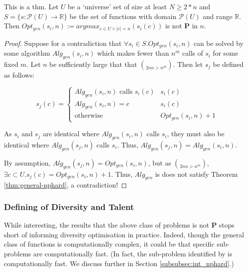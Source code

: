 \begin{theorem}\label{thm:general-nphard}
    This is a thm.
    Let $U$ be a `universe' set of size at least $N \geq 2*n$ and $S = \{s: \mathcal{P} (U) \rightarrow \mathbb{R}\}$ be the set of functions with domain  $\mathcal{P} (U)$ and range $\mathbb{R}$. Then $Opt_{gen}(s_i, n) := argmax_{c \in U \land |c| = n}(s_i(c))$ is not $\mathbf{P}$ in $n$.
\end{theorem}

\begin{proof}
Suppose for a contradiction that $\forall s_i \in S . Opt_{gen}(s_i, n)$ can be solved by some algorithm $Alg_{gen}(s_i, n)$ which makes fewer than $n^m$ calls of $s_i$ for some fixed $m$. Let $n$ be sufficiently large that that $\choose{2n}{n} > n^m$. Then let $s_j$ be defined as follows:

\begin{equation}
s_j(c) = 
    \begin{cases} 
        Alg_{gen}(s_i, n) \text{ calls } s_i(c) & s_i(c) \\
        Alg_{gen}(s_i, n) = c & s_i(c)          \\
        \text{otherwise} & Opt_{gen}(s_i, n) + 1 
    \end{cases}
\end{equation}

\noindent As $s_i$ and $s_j$ are identical where $Alg_{gen}(s_i, n)$ calls $s_i$, they must also be identical where $Alg_{gen}(s_j, n)$ calls $s_i$. Thus, $Alg_{gen}(s_j, n) = Alg_{gen}(s_i, n)$.

By assumption, $Alg_{gen}(s_j, n) = Opt_{gen}(s_i, n)$, but as $\choose{2n}{n} > n^m$, $\exists c \subset U . s_j(c) = Opt_{gen}(s_i, n) + 1$. Thus, $Alg_{gen}$ is does not satisfy Theorem \ref{thm:general-nphard}, a contradiction!
\end{proof}

\subsubsection{Defining of Diversity and Talent}\label{subsubsec:div_talent_def}
While interesting, the results that the above class of problems is not $\mathbf{P}$ stops short of informing diversity optimisation in practice. Indeed, though the general class of functions is computationally complex, it could be that specific sub-problems are computationally fast. (In fact, the sub-problem identified by \textcite{kleinberg2018algorithmic} is computationally fast. We discuss further in Section \ref{subsubsec:int_nphard}.)

